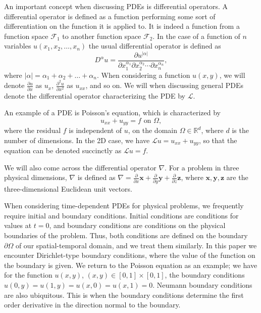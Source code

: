 An important concept when discussing PDEs is differential operators.
A differential operator is defined as a function performing some sort of differentiation on the function it is applied to.
It is indeed a function from a function space $\mathcal{F}_1$ to another function space $\mathcal{F}_2$.
In the case of a function of $n$ variables $u(x_1, x_2, \ldots , x_n)$ the usual differential operator is defined as 
\begin{equation*}
    D^\alpha u = \frac{\partial u^{|\alpha|}}{\partial x_1^{\alpha_1} \partial x_2^{\alpha_2} \cdots \partial x_n^{\alpha_n}},
\end{equation*}
where $|\alpha| = \alpha_1 + \alpha_2 + \ldots + \alpha_n$.
When considering a function $u(x,y)$, we will denote $\frac{\partial u}{\partial x}$ as $u_x$, $\frac{\partial^2 u}{\partial x^2}$ as $u_{xx}$, and so on.
We will when discussing general PDEs denote the differential operator characterizing the PDE by $\mathcal{L}$.

An example of a PDE is Poisson's equation, which is characterized by
\begin{equation*}
    u_{xx} + u_{yy} = f \text{ on }\Omega,
\end{equation*}
where the residual $f$ is independent of $u$, on the domain $\Omega \in \mathbb{R}^d$, where $d$ is the number of dimensions.
In the 2D case, we have $\mathcal{L}u = u_{xx} + u_{yy}$, so that the equation can be denoted succinctly as $\mathcal{L}u = f$.

We will also come across the differential operator $\nabla$.
For a problem in three physical dimensions, $\nabla$ is defined as $\nabla = \frac{\partial}{\partial x}\boldsymbol{x} + \frac{\partial}{\partial y}\boldsymbol{y} + \frac{\partial}{\partial z}\boldsymbol{z}$, where $\boldsymbol{x},\boldsymbol{y},\boldsymbol{z}$ are the three-dimensional Euclidean unit vectors.

When considering time-dependent PDEs for physical problems, we frequently require initial and boundary conditions.
Initial conditions are conditions for values at $t=0$, and boundary conditions are conditions on the physical boundaries of the problem.
Thus, both conditions are defined on the boundary $\partial\Omega$ of our spatial-temporal domain, and we treat them similarly.
In this paper we encounter Dirichlet-type boundary conditions, where the value of the function on the boundary is given.
We return to the Poisson equation as an example;
we have for the function $u(x,y)$, $(x,y) \in [0,1]\times [0,1]$, the boundary conditions $u(0,y)=u(1,y)=u(x,0)=u(x,1) = 0$.
Neumann boundary conditions are also ubiquitous. This is when the boundary conditions determine the first order derivative in the direction normal to the boundary. 

